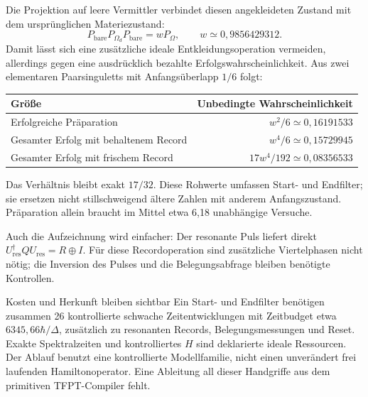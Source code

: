 Die Projektion auf leere Vermittler verbindet diesen angekleideten Zustand mit dem ursprünglichen Materiezustand:
\begin{equation}
P_{\mathrm{bare}}P_{\Omega_d}P_{\mathrm{bare}}=wP_\Omega,
\qquad w\simeq0{,}9856429312.
\end{equation}
Damit lässt sich eine zusätzliche ideale Entkleidungsoperation vermeiden, allerdings gegen eine ausdrücklich bezahlte Erfolgswahrscheinlichkeit. Aus zwei elementaren Paarsinguletts mit Anfangsüberlapp $1/6$ folgt:
\begin{center}
\begin{tabular}{lr}
\toprule Größe&Unbedingte Wahrscheinlichkeit\\\midrule
Erfolgreiche Präparation&$w^2/6\simeq0{,}16191533$\\
Gesamter Erfolg mit behaltenem Record&$w^4/6\simeq0{,}15729945$\\
Gesamter Erfolg mit frischem Record&$17w^4/192\simeq0{,}08356533$\\\bottomrule
\end{tabular}
\end{center}
Das Verhältnis bleibt exakt $17/32$. Diese Rohwerte umfassen Start- und Endfilter; sie ersetzen nicht stillschweigend ältere Zahlen mit anderem Anfangszustand. Präparation allein braucht im Mittel etwa 6,18 unabhängige Versuche.

Auch die Aufzeichnung wird einfacher: Der resonante Puls liefert direkt $U_{\mathrm{res}}^\dagger Q U_{\mathrm{res}}=R\oplus I$. Für diese Recordoperation sind zusätzliche Viertelphasen nicht nötig; die Inversion des Pulses und die Belegungsabfrage bleiben benötigte Kontrollen.

\begin{grenze}{Kosten und Herkunft bleiben sichtbar}
Ein Start- und Endfilter benötigen zusammen 26 kontrollierte schwache Zeitentwicklungen mit Zeitbudget etwa $6345{,}66\hbar/\Delta$, zusätzlich zu resonanten Records, Belegungsmessungen und Reset. Exakte Spektralzeiten und kontrolliertes $H$ sind deklarierte ideale Ressourcen. Der Ablauf benutzt eine kontrollierte Modellfamilie, nicht einen unverändert frei laufenden Hamiltonoperator. Eine Ableitung all dieser Handgriffe aus dem primitiven TFPT-Compiler fehlt.
\end{grenze}

